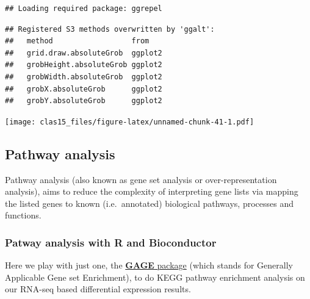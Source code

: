 \documentclass[
]{article}
\newenvironment{Shaded}{\begin{snugshade}}{\end{snugshade}}
\newcommand{\AttributeTok}[1]{\textcolor[rgb]{0.77,0.63,0.00}{#1}}
\newcommand{\FunctionTok}[1]{\textcolor[rgb]{0.00,0.00,0.00}{#1}}
\newcommand{\NormalTok}[1]{#1}
\newcommand{\OtherTok}[1]{\textcolor[rgb]{0.56,0.35,0.01}{#1}}
\newcommand{\SpecialCharTok}[1]{\textcolor[rgb]{0.00,0.00,0.00}{#1}}
\newcommand{\StringTok}[1]{\textcolor[rgb]{0.31,0.60,0.02}{#1}}
\begin{document}
\begin{verbatim}
## Loading required package: ggrepel
\end{verbatim}

\begin{verbatim}
## Registered S3 methods overwritten by 'ggalt':
##   method                  from   
##   grid.draw.absoluteGrob  ggplot2
##   grobHeight.absoluteGrob ggplot2
##   grobWidth.absoluteGrob  ggplot2
##   grobX.absoluteGrob      ggplot2
##   grobY.absoluteGrob      ggplot2
\end{verbatim}

\begin{Shaded}
\end{Shaded}

\texttt{[image: clas15\_files/figure-latex/unnamed-chunk-41-1.pdf]}

\hypertarget{pathway-analysis}{%
\subsection{Pathway analysis}\label{pathway-analysis}}

Pathway analysis (also known as gene set analysis or over-representation
analysis), aims to reduce the complexity of interpreting gene lists via
mapping the listed genes to known (i.e.~annotated) biological pathways,
processes and functions.

\hypertarget{patway-analysis-with-r-and-bioconductor}{%
\subsubsection{Patway analysis with R and
Bioconductor}\label{patway-analysis-with-r-and-bioconductor}}

Here we play with just one, the
\href{https://bioconductor.org/packages/release/bioc/html/gage.html}{\textbf{GAGE}
package} (which stands for Generally Applicable Gene set Enrichment), to
do KEGG pathway enrichment analysis on our RNA-seq based differential
expression results.
\end{document}
